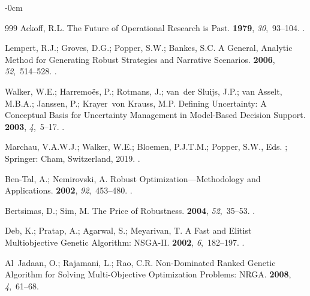 \documentclass[systems,article,accept,moreauthors,pdftex]{Definitions/mdpi}
\begin{document}
\begin{adjustwidth}{-\extralength}{0cm}
\begin{thebibliography}{999}
Ackoff, R.L.
\newblock The Future of Operational Research is Past.
 {\bf 1979}, {\em
  30},~93--104.
.

Lempert, R.J.; Groves, D.G.; Popper, S.W.; Bankes, S.C.
\newblock A General, Analytic Method for Generating Robust Strategies and
  Narrative Scenarios.
 {\bf 2006}, {\em 52},~514--528.
.

Walker, W.E.; Harremo{\"e}s, P.; Rotmans, J.; van~der Sluijs, J.P.; van Asselt,
  M.B.A.; Janssen, P.; Krayer~von Krauss, M.P.
\newblock Defining Uncertainty: A Conceptual Basis for Uncertainty Management
  in Model-Based Decision Support.
 {\bf 2003}, {\em 4},~5--17.
.

Marchau, V.A.W.J.; Walker, W.E.; Bloemen, P.J.T.M.; Popper, S.W., Eds.
; Springer: Cham, Switzerland,  2019.
.

Ben-Tal, A.; Nemirovski, A.
\newblock Robust Optimization---Methodology and Applications.
 {\bf 2002}, {\em 92},~453--480.
.

Bertsimas, D.; Sim, M.
\newblock The Price of Robustness.
 {\bf 2004}, {\em 52},~35--53.
.

Deb, K.; Pratap, A.; Agarwal, S.; Meyarivan, T.
\newblock A Fast and Elitist Multiobjective Genetic Algorithm: {NSGA-II}.
 {\bf 2002}, {\em
  6},~182--197.
.

Al~Jadaan, O.; Rajamani, L.; Rao, C.R.
\newblock Non-Dominated Ranked Genetic Algorithm for Solving Multi-Objective
  Optimization Problems: {NRGA}.
 {\bf
  2008}, {\em 4},~61--68.


\end{thebibliography}
\end{adjustwidth}
\end{document}
